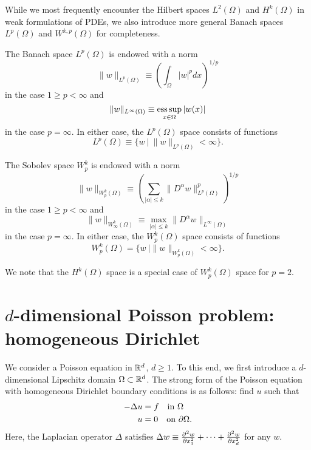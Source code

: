 While we most frequently encounter the Hilbert spaces $L^2(\Omega)$ and $H^k(\Omega)$ in weak formulations of PDEs, we also introduce more general Banach spaces $L^p(\Omega)$ and $W^{k,p}(\Omega)$ for completeness.
\begin{definition}
  The Banach space $L^p(\Omega)$ is endowed with a norm
  \begin{equation*}
    \| w \|_{L^p(\Omega)} \equiv \left(\int_\Omega |w|^p dx\right)^{1/p}
  \end{equation*}
  in the case $1 \geq p < \infty$ and
  \begin{equation*}
    \| w \|_{L^\infty(\Omega)} \equiv \operatorname*{ess\,sup}_{x \in \Omega} | w(x) | 
  \end{equation*}
  in the case $p = \infty$.   In either case, the $L^p(\Omega)$ space consists of functions
  \begin{equation*}
    L^p(\Omega) \equiv \{ w \ | \ \| w \|_{L^p(\Omega)} < \infty \}.
  \end{equation*}
\end{definition}
\begin{definition}[$W^k_p$ space]
  The Sobolev space $W^k_p$ is endowed with a norm
  \begin{equation*}
    \| w \|_{W^k_p(\Omega)} \equiv \left( \sum_{|\alpha|\leq k} \| D^\alpha w \|^p_{L^p(\Omega)} \right)^{1/p}
  \end{equation*}
  in the case $1 \geq p < \infty$ and
  \begin{equation*}
    \| w \|_{W^k_\infty(\Omega)} \equiv \max_{|\alpha| \leq k} \| D^\alpha w \|_{L^\infty(\Omega)}
  \end{equation*}
  in the case $p = \infty$. In either case, the $W^k_p(\Omega)$ space consists of functions
  \begin{equation*}
    W^k_p(\Omega) = \{ w \ | \| w \|_{W^k_p(\Omega)} < \infty \}.
  \end{equation*}
\end{definition}
We note that the $H^k(\Omega)$ space is a special case of $W^k_p(\Omega)$ space for $p = 2$.



\section{$d$-dimensional Poisson problem: homogeneous Dirichlet}
We consider a Poisson equation in $\mathbb{R}^d$, $d \geq 1$.  To this end, we first introduce a $d$-dimensional Lipschitz domain $\Omega \subset \mathbb{R}^d$. The strong form of the Poisson equation with homogeneous Dirichlet boundary conditions is as follows: find $u$ such that
\begin{align}
  - \Delta u &= f \quad \text{in } \Omega \label{eq:gen_poisson_nd_strong} \\
  u &= 0 \quad \text{on } \partial \Omega \notag.
\end{align}
 Here, the Laplacian operator $\Delta$ satisfies $\Delta w \equiv \frac{\partial ^2w}{\partial x^2_1} + \cdots + \frac{\partial ^2w}{\partial x^2_d}$ for any $w$.

